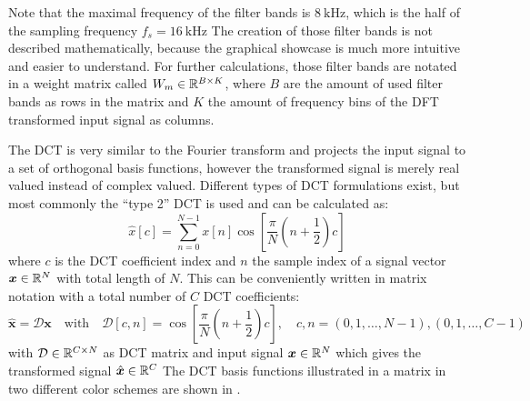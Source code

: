 \FloatBarrier
\noindent
Note that the maximal frequency of the filter bands is $\SI{8}{\kilo\hertz}$, which is the half of the sampling frequency $f_s = \SI{16}{\kilo\hertz}$
The creation of those filter bands is not described mathematically, because the graphical showcase is much more intuitive and easier to understand.
For further calculations, those filter bands are notated in a weight matrix called $W_m \in \mathbb{R}^{B \times K}$, where $B$ are the amount of used filter bands as rows in the matrix and $K$ the amount of frequency bins of the DFT transformed input signal as columns.

The DCT is very similar to the Fourier transform and projects the input signal to a set of orthogonal basis functions, however the transformed signal is merely real valued instead of complex valued.
Different types of DCT formulations exist, but most commonly the \enquote{type 2} DCT is used and can be calculated as:
\begin{equation}\label{eq:signal_mfcc_dct}
  \hat{x}[c] = \sum_{n=0}^{N-1} x[n] \cos{\left[ \frac{\pi}{N} \left( n + \frac{1}{2} \right) c \right]}
\end{equation}
where $c$ is the DCT coefficient index and $n$ the sample index of a signal vector $\bm{x} \in \mathbb{R}^N$ with total length of $N$.
This can be conveniently written in matrix notation with a total number of $C$ DCT coefficients:
\begin{equation}\label{eq:signal_mfcc_dct_matrix}
  \hat{\bm{x}} = \mathcal{D} \bm{x} \quad \mathrm{with} \quad \mathcal{D}[c, n] = \cos{\left[ \frac{\pi}{N} \left( n + \frac{1}{2} \right) c  \right]}, 
  \quad c, n = (0, 1, \dots, N - 1), (0, 1, \dots, C - 1) 
\end{equation}
with $\mathcal{D} \in \mathbb{R}^{C \times N}$ as DCT matrix and input signal $\bm{x} \in \mathbb{R}^N$ which gives the transformed signal $\hat{\bm{x}} \in \mathbb{R}^C$
The DCT basis functions illustrated in a matrix in two different color schemes are shown in .
